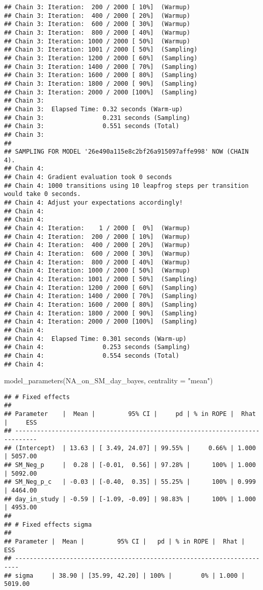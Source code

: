 \documentclass[
]{article}
\newenvironment{Shaded}{\begin{snugshade}}{\end{snugshade}}
\newcommand{\AttributeTok}[1]{\textcolor[rgb]{0.77,0.63,0.00}{#1}}
\newcommand{\FunctionTok}[1]{\textcolor[rgb]{0.00,0.00,0.00}{#1}}
\newcommand{\NormalTok}[1]{#1}
\newcommand{\StringTok}[1]{\textcolor[rgb]{0.31,0.60,0.02}{#1}}
\begin{document}
\begin{verbatim}
## Chain 3: Iteration:  200 / 2000 [ 10%]  (Warmup)
## Chain 3: Iteration:  400 / 2000 [ 20%]  (Warmup)
## Chain 3: Iteration:  600 / 2000 [ 30%]  (Warmup)
## Chain 3: Iteration:  800 / 2000 [ 40%]  (Warmup)
## Chain 3: Iteration: 1000 / 2000 [ 50%]  (Warmup)
## Chain 3: Iteration: 1001 / 2000 [ 50%]  (Sampling)
## Chain 3: Iteration: 1200 / 2000 [ 60%]  (Sampling)
## Chain 3: Iteration: 1400 / 2000 [ 70%]  (Sampling)
## Chain 3: Iteration: 1600 / 2000 [ 80%]  (Sampling)
## Chain 3: Iteration: 1800 / 2000 [ 90%]  (Sampling)
## Chain 3: Iteration: 2000 / 2000 [100%]  (Sampling)
## Chain 3: 
## Chain 3:  Elapsed Time: 0.32 seconds (Warm-up)
## Chain 3:                0.231 seconds (Sampling)
## Chain 3:                0.551 seconds (Total)
## Chain 3: 
## 
## SAMPLING FOR MODEL '26e490a115e8c2bf26a915097affe998' NOW (CHAIN 4).
## Chain 4: 
## Chain 4: Gradient evaluation took 0 seconds
## Chain 4: 1000 transitions using 10 leapfrog steps per transition would take 0 seconds.
## Chain 4: Adjust your expectations accordingly!
## Chain 4: 
## Chain 4: 
## Chain 4: Iteration:    1 / 2000 [  0%]  (Warmup)
## Chain 4: Iteration:  200 / 2000 [ 10%]  (Warmup)
## Chain 4: Iteration:  400 / 2000 [ 20%]  (Warmup)
## Chain 4: Iteration:  600 / 2000 [ 30%]  (Warmup)
## Chain 4: Iteration:  800 / 2000 [ 40%]  (Warmup)
## Chain 4: Iteration: 1000 / 2000 [ 50%]  (Warmup)
## Chain 4: Iteration: 1001 / 2000 [ 50%]  (Sampling)
## Chain 4: Iteration: 1200 / 2000 [ 60%]  (Sampling)
## Chain 4: Iteration: 1400 / 2000 [ 70%]  (Sampling)
## Chain 4: Iteration: 1600 / 2000 [ 80%]  (Sampling)
## Chain 4: Iteration: 1800 / 2000 [ 90%]  (Sampling)
## Chain 4: Iteration: 2000 / 2000 [100%]  (Sampling)
## Chain 4: 
## Chain 4:  Elapsed Time: 0.301 seconds (Warm-up)
## Chain 4:                0.253 seconds (Sampling)
## Chain 4:                0.554 seconds (Total)
## Chain 4:
\end{verbatim}

\begin{Shaded}
\begin{Highlighting}[]
\FunctionTok{model\_parameters}\NormalTok{(NA\_on\_SM\_day\_bayes, }\AttributeTok{centrality =} \StringTok{"mean"}\NormalTok{)}
\end{Highlighting}
\end{Shaded}

\begin{verbatim}
## # Fixed effects
## 
## Parameter    |  Mean |         95% CI |     pd | % in ROPE |  Rhat |     ESS
## ----------------------------------------------------------------------------
## (Intercept)  | 13.63 | [ 3.49, 24.07] | 99.55% |     0.66% | 1.000 | 5057.00
## SM_Neg_p     |  0.28 | [-0.01,  0.56] | 97.28% |      100% | 1.000 | 5092.00
## SM_Neg_p_c   | -0.03 | [-0.40,  0.35] | 55.25% |      100% | 0.999 | 4464.00
## day_in_study | -0.59 | [-1.09, -0.09] | 98.83% |      100% | 1.000 | 4953.00
## 
## # Fixed effects sigma
## 
## Parameter |  Mean |         95% CI |   pd | % in ROPE |  Rhat |     ESS
## -----------------------------------------------------------------------
## sigma     | 38.90 | [35.99, 42.20] | 100% |        0% | 1.000 | 5019.00
\end{verbatim}
\end{document}
